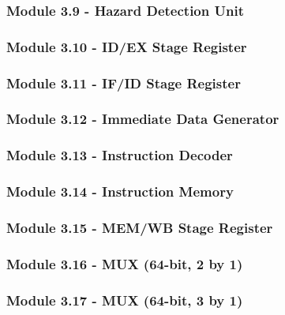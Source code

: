 \documentclass[12pt]{article}
\begin{document}
\subsubsection*{\large Module 3.9 - Hazard Detection Unit}
\label{hdu}

\subsubsection*{\large Module 3.10 - ID/EX Stage Register}
\label{id_ex}

\subsubsection*{\large Module 3.11 - IF/ID Stage Register}
\label{if_id}

\subsubsection*{\large Module 3.12 - Immediate Data Generator}

\subsubsection*{\large Module 3.13 - Instruction Decoder}

\subsubsection*{\large Module 3.14 - Instruction Memory}

\subsubsection*{\large Module 3.15 - MEM/WB Stage Register}
\label{mem_wb}

\subsubsection*{\large Module 3.16 - MUX (64-bit, 2 by 1)}

\subsubsection*{\large Module 3.17 - MUX (64-bit, 3 by 1)}

\end{document}
